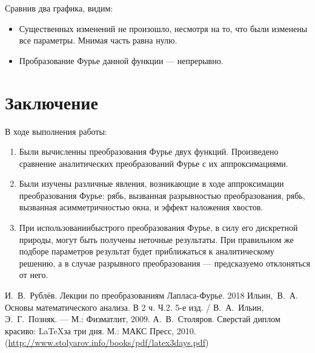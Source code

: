 \documentclass[a4paper, 11pt]{article}
\begin{document}
        Сравнив два графика, видим:
        \begin{itemize}
            \item
                Существенных изменений не произошло, несмотря на то, что были изменены все параметры. Мнимая часть равна нулю.
            \item
                Пробразование Фурье данной функции — непрерывно.
        \end{itemize}
\clearpage
\section{Заключение}
    В ходе выполнения работы:
    \begin{enumerate}
        \item
            Были вычисленны преобразования Фурье двух функций. Произведено сравнение аналитических преобразований Фурье с их аппроксимациями.
        \item
            Были изучены различные явления, возникающие в ходе аппроксимации преобразования Фурье: рябь, вызванная разрывностью преобразования, рябь, вызванная асимметричностью окна, и эффект наложения хвостов.
        \item
            При использованиибыстрого преобразования Фурье, в силу его дискретной природы, могут быть получены неточные результаты. При правильном же подборе параметров результат будет приближаться к аналитическому решению, а в случае разрывного преобразования --- предсказуемо отклоняться от него.
    \end{enumerate}
\begin{thebibliography}{99}
	 И.~В.~Рублёв. Лекции по преобразованиям Лапласа-Фурье. 2018
	Ильин,~В.~А. Основы математического анализа. В 2 ч. Ч.2. 5-е изд. / В.~А.~Ильин, Э.~Г.~Позняк. --- М.: Физматлит, 2009.
	 А.~В.~Столяров. Сверстай диплом красиво: \LaTeX за три дня. М.: МАКС Пресс, 2010. (\url{http://www.stolyarov.info/books/pdf/latex3days.pdf})

\end{thebibliography}
    
\end{document}
